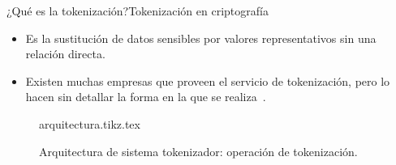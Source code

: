 \begin{frame}{¿Qué es la tokenización?}{Tokenización en criptografía}
  \begin{itemize}
    \item Es la sustitución de datos sensibles por valores representativos
      sin una relación directa.
    \item Existen muchas empresas que proveen el servicio de tokenización,
      pero lo hacen sin detallar la forma en la que se
      realiza~\cite{shif4_uno, braintree_uno, securosis}.
  \end{itemize}

  \begin{figure}
    \centering
    {arquitectura.tikz.tex}
    \caption{Arquitectura de sistema tokenizador: operación de tokenización.}
  \end{figure}

\end{frame}

